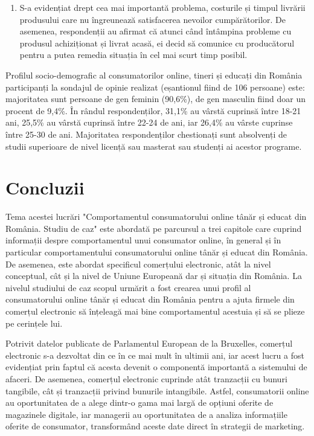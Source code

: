 \documentclass[a4paper, 12pt]{article}
\begin{document}
\begin{enumerate}[1.]
	\item S-a evidențiat drept cea mai importantă problema, costurile și timpul livrării produsului care nu îngreunează satisfacerea nevoilor cumpărătorilor. De asemenea, respondenții au afirmat că atunci când întâmpina probleme cu produsul achiziționat și livrat acasă, ei decid să comunice cu producătorul pentru a putea remedia situația în cel mai scurt timp posibil. 
	\end{enumerate} 

	\quad Profilul socio-demografic al consumatorilor online, tineri și educați din România participanți la sondajul de opinie realizat (eșantionul fiind de 106 persoane) este: majoritatea sunt persoane de gen feminin (90,6\%), de gen masculin fiind doar un procent de 9,4\%.  În rândul respondenților, 31,1\% au vârstă cuprinsă între 18-21 ani, 25,5\% au vârstă cuprinsă între 22-24 de ani, iar 26,4\% au vârste cuprinse între 25-30 de ani. Majoritatea respondenților chestionați sunt absolvenți de studii superioare de nivel licență sau masterat sau studenți ai acestor programe. 
	
	

	
	\newpage 
	\section*{Concluzii}
	
	\qquad\qquad Tema acestei lucrări "Comportamentul consumatorului online tânăr și educat din România. Studiu de caz" este abordată pe parcursul a trei capitole care cuprind informații despre comportamentul unui consumator online, în general și în particular comportamentului consumatorului online tânăr și educat din România. De asemenea, este abordat specificul comerțului electronic, atât la nivel conceptual, cât și la nivel de Uniune Europeană dar și situația din România. La nivelul studiului de caz scopul urmărit a fost crearea unui profil al consumatorului online tânăr și educat din România pentru a ajuta firmele din comerțul electronic să înțeleagă mai bine comportamentul acestuia și să se plieze pe cerințele lui.
	
	\quad Potrivit datelor publicate de Parlamentul European de la Bruxelles,  comerțul electronic s-a dezvoltat din ce în ce mai mult în ultimii ani, iar acest lucru a fost evidențiat prin faptul că acesta devenit o componentă importantă a sistemului de afaceri. De asemenea, comerțul electronic cuprinde atât tranzacții cu bunuri tangibile, cât și tranzacții privind bunurile intangibile. Astfel, consumatorii online au oportunitatea de a alege dintr-o gama mai largă de opțiuni oferite de magazinele digitale, iar managerii au oportunitatea de a analiza informațiile oferite de consumator, transformând aceste date direct în strategii de marketing. 
	
\end{document}
